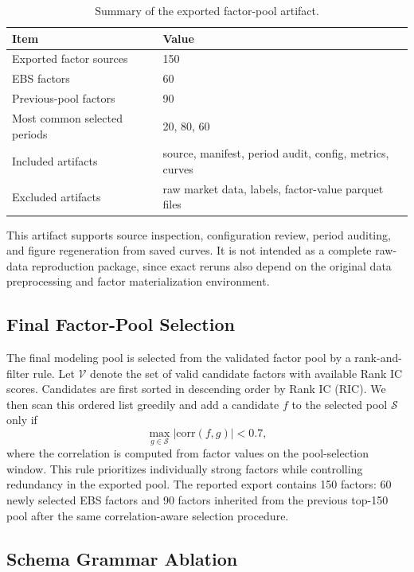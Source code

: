 \begin{table}[t]
\centering
\caption{Summary of the exported factor-pool artifact.}
\label{tab:appendix_export_scope}
\small
\begin{tabularx}{\columnwidth}{lX}
\toprule
\textbf{Item} & \textbf{Value} \\
\midrule
Exported factor sources & 150 \\
EBS factors & 60 \\
Previous-pool factors & 90 \\
Most common selected periods & 20, 80, 60 \\
Included artifacts & source, manifest, period audit, config, metrics, curves \\
Excluded artifacts & raw market data, labels, factor-value parquet files \\
\bottomrule
\end{tabularx}
\end{table}

This artifact supports source inspection, configuration review, period auditing, and figure regeneration from saved curves. It is not intended as a complete raw-data reproduction package, since exact reruns also depend on the original data preprocessing and factor materialization environment.

\subsection{Final Factor-Pool Selection}

The final modeling pool is selected from the validated factor pool by a rank-and-filter rule. Let \(\mathcal{V}\) denote the set of valid candidate factors with available Rank IC scores. Candidates are first sorted in descending order by Rank IC (RIC). We then scan this ordered list greedily and add a candidate \(f\) to the selected pool \(\mathcal{S}\) only if
\begin{equation}
\max_{g\in\mathcal{S}} |\mathrm{corr}(f,g)| < 0.7,
\end{equation}
where the correlation is computed from factor values on the pool-selection window. This rule prioritizes individually strong factors while controlling redundancy in the exported pool. The reported export contains 150 factors: 60 newly selected EBS factors and 90 factors inherited from the previous top-150 pool after the same correlation-aware selection procedure.


\subsection{Schema Grammar Ablation}

